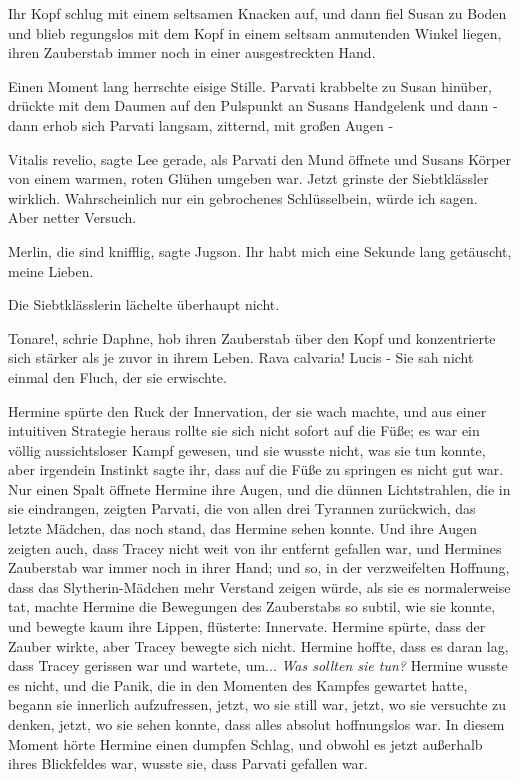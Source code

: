 Ihr Kopf schlug mit einem seltsamen Knacken auf, und dann fiel Susan zu Boden
und blieb regungslos mit dem Kopf in einem seltsam anmutenden Winkel liegen,
ihren Zauberstab immer noch in einer ausgestreckten Hand.

Einen Moment lang herrschte eisige Stille. Parvati krabbelte zu Susan hinüber,
drückte mit dem Daumen auf den Pulspunkt an Susans Handgelenk und dann - dann
erhob sich Parvati langsam, zitternd, mit großen Augen -

\glqq{}Vitalis revelio\grqq{}, sagte Lee gerade, als Parvati den Mund öffnete und
Susans Körper von einem warmen, roten Glühen umgeben war. Jetzt grinste der
Siebtklässler wirklich. \glqq{}Wahrscheinlich nur ein gebrochenes Schlüsselbein,
würde ich sagen. Aber netter Versuch.\grqq{}

\glqq{}Merlin, die sind knifflig\grqq{}, sagte Jugson. \glqq{}Ihr habt mich eine
Sekunde lang getäuscht, meine Lieben.\grqq{}

Die Siebtklässlerin lächelte überhaupt nicht.

\glqq{}Tonare!\grqq{}, schrie Daphne, hob ihren Zauberstab über den Kopf und
konzentrierte sich stärker als je zuvor in ihrem Leben. \glqq{}Rava calvaria!
Lucis -\grqq{} Sie sah nicht einmal den Fluch, der sie erwischte.

Hermine spürte den Ruck der Innervation, der sie wach machte, und aus einer
intuitiven Strategie heraus rollte sie sich nicht sofort auf die Füße; es war
ein völlig aussichtsloser Kampf gewesen, und sie wusste nicht, was sie tun
konnte, aber irgendein Instinkt sagte ihr, dass auf die Füße zu springen es
nicht gut war. Nur einen Spalt öffnete Hermine ihre Augen, und die dünnen
Lichtstrahlen, die in sie eindrangen, zeigten Parvati, die von allen drei
Tyrannen zurückwich, das letzte Mädchen, das noch stand, das Hermine sehen
konnte. Und ihre Augen zeigten auch, dass Tracey nicht weit von ihr entfernt
gefallen war, und Hermines Zauberstab war immer noch in ihrer Hand; und so, in
der verzweifelten Hoffnung, dass das Slytherin-Mädchen mehr Verstand zeigen
würde, als sie es normalerweise tat, machte Hermine die Bewegungen des
Zauberstabs so subtil, wie sie konnte, und bewegte kaum ihre Lippen, flüsterte:
\glqq{}Innervate.\grqq{} Hermine spürte, dass der Zauber wirkte, aber Tracey
bewegte sich nicht. Hermine hoffte, dass es daran lag, dass Tracey gerissen war
und wartete, um... \emph{Was sollten sie tun?} Hermine wusste es nicht, und die
Panik, die in den Momenten des Kampfes gewartet hatte, begann sie innerlich
aufzufressen, jetzt, wo sie still war, jetzt, wo sie versuchte zu denken, jetzt,
wo sie sehen konnte, dass alles absolut hoffnungslos war. In diesem Moment hörte
Hermine einen dumpfen Schlag, und obwohl es jetzt außerhalb ihres Blickfeldes
war, wusste sie, dass Parvati gefallen war.

